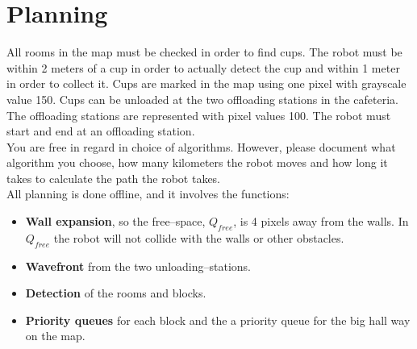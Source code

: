 \section{Planning}
\label{sec::planning}
All rooms in the map must be checked in order to find cups. The robot must be within 2 meters of a cup in order to actually detect the cup and within 1 meter in order to collect it. Cups are marked in the map using one pixel with grayscale value 150. Cups can be unloaded at the two offloading stations in the cafeteria. The offloading stations are represented with pixel values 100. The robot must start and end at an offloading station.\\[0.2cm]
You are free in regard in choice of algorithms. However, please document what algorithm you choose, how many kilometers the robot moves and how long it takes to calculate the path the robot takes.\\[0.2cm]
All planning is done offline, and it involves the functions:
\begin{itemize}\itemsep-2pt
\item \textbf{Wall expansion}, so the free--space, $Q_{free}$, is 4 pixels away from the walls. In $Q_{free}$ the robot will not collide with the walls or other obstacles.
\item \textbf{Wavefront} from the two unloading--stations.
\item \textbf{Detection} of the rooms and blocks.
\item \textbf{Priority queues} for each block and the a priority queue for the big hall way on the map.
\end{itemize}

